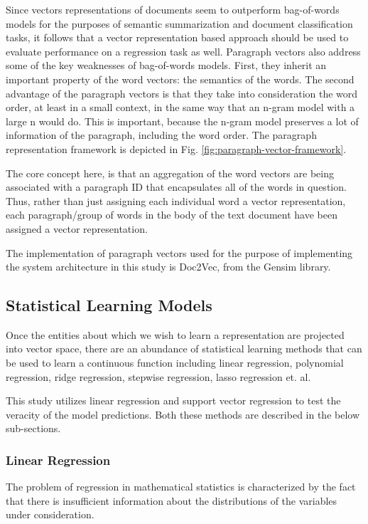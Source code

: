 \documentclass[conference]{IEEEtran}
\begin{document}
        Since vectors representations of documents seem to outperform bag-of-words models for the purposes of semantic summarization and document classification tasks, it follows that a vector representation based approach should be used to evaluate performance on a regression task as well. 
        Paragraph vectors also address some of the key weaknesses of bag-of-words models. 
        First, they inherit an important property of the word vectors: the semantics of the words. 
        The second advantage of the paragraph vectors is that they take into consideration the word order, at least in a small context, in the same way that an n-gram model with a large n would do. 
        This is important, because the n-gram model preserves a lot of information of the paragraph, including the word order\cite{le2014distributed}.
        The paragraph representation framework is depicted in Fig. \ref{fig:paragraph-vector-framework}. 

        The core concept here, is that an aggregation of the word vectors are being associated with a paragraph ID that encapsulates all of the words in question. 
        Thus, rather than just assigning each individual word a vector representation, each paragraph/group of words in the body of the text document have been assigned a vector representation.

        The implementation of paragraph vectors used for the purpose of implementing the system architecture in this study is Doc2Vec, from the Gensim library\cite{doc2vec_api}.


    \subsection{Statistical Learning Models}
        Once the entities about which we wish to learn a representation are projected into vector space, there are an abundance of statistical learning methods that can be used to learn a continuous function including linear regression, polynomial regression, ridge regression, stepwise regression, lasso regression et. al.

        This study utilizes linear regression and support vector regression to test the veracity of the model predictions.
        Both these methods are described in the below sub-sections.

        \subsubsection{Linear Regression}
            The problem of regression in mathematical statistics is characterized by the fact that there is insufficient information about the distributions of the variables under consideration\cite{regression_analysis}.
\end{document}
